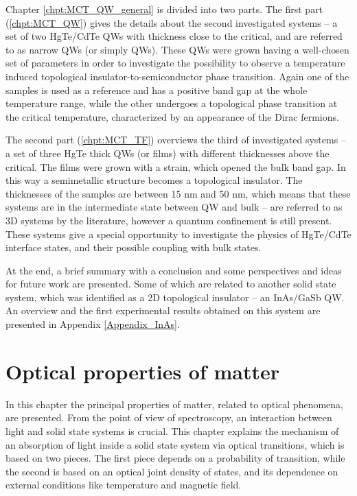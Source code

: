 \documentclass[titlepage,a4paper]{book}
\newcommand{\wciecie}{\quad\phantom{v}}
\begin{document}
Chapter \ref{chpt:MCT_QW_general} is divided into two parts. The first part (\ref{chpt:MCT_QW}) gives the details about the second investigated systems -- a set of two HgTe/CdTe QWs with thickness close to the critical, and are referred to as narrow QWs (or simply QWs). These QWs were grown having a well-chosen set of parameters in order to investigate the possibility to observe a temperature induced topological insulator-to-semiconductor phase transition. Again one of the samples is used as a reference and has a positive band gap at the whole temperature range, while the other undergoes a topological phase transition at the critical temperature, characterized by an appearance of the Dirac fermions. 

The second part (\ref{chpt:MCT_TF}) overviews the third of investigated systems -- a set of three HgTe thick QWs (or films) with different thicknesses above the critical. The films were grown with a strain, which opened the bulk band gap. In this way a semimetallic structure becomes a topological insulator. The thicknesses of the samples are between 15 nm and 50 nm, which means that these systems are in the intermediate state between QW and bulk -- are referred to as 3D systems by the literature, however a quantum confinement is still present. These systems give a special opportunity to investigate the physics of HgTe/CdTe interface states, and their possible coupling with bulk states.

At the end, a brief summary with a conclusion and some perspectives and ideas for future work are presented. Some of which are related to another solid state system, which was identified as a 2D topological insulator -- an InAs/GaSb QW. An overview and the first experimental results obtained on this system are presented in Appendix \ref{Appendix_InAs}. 

\chapter{Optical properties of matter}
\label{chpt:optical}
\wciecie
In this chapter the principal properties of matter, related to optical phenomena, are presented. From the point of view of spectroscopy, an interaction between light and solid state systems is crucial. This chapter explains the mechanism of an absorption of light inside a solid state system via optical transitions, which is based on two pieces. The first piece depends on a probability of transition, while the second is based on an optical joint density of states, and its dependence on external conditions like temperature and magnetic field. 
\end{document}
